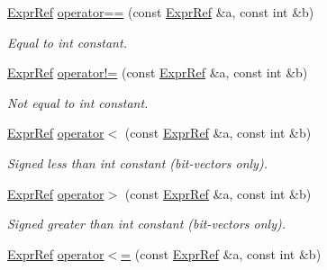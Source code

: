\begin{DoxyCompactItemize}
\mbox{\hyperlink{classilang_1_1_expr_ref}{Expr\+Ref}} \mbox{\hyperlink{namespaceilang_a0a5988961e07922c24fb867882884968}{operator==}} (const \mbox{\hyperlink{classilang_1_1_expr_ref}{Expr\+Ref}} \&a, const int \&b)
\begin{DoxyCompactList}\small\item\em Equal to int constant. \end{DoxyCompactList}\item 
\mbox{\label{namespaceilang_a13309390fcb98b680269a31df32ee983}} 
\mbox{\hyperlink{classilang_1_1_expr_ref}{Expr\+Ref}} \mbox{\hyperlink{namespaceilang_a13309390fcb98b680269a31df32ee983}{operator!=}} (const \mbox{\hyperlink{classilang_1_1_expr_ref}{Expr\+Ref}} \&a, const int \&b)
\begin{DoxyCompactList}\small\item\em Not equal to int constant. \end{DoxyCompactList}\item 
\mbox{\label{namespaceilang_accb89a7f987956d5bd1d9f7233c318d6}} 
\mbox{\hyperlink{classilang_1_1_expr_ref}{Expr\+Ref}} \mbox{\hyperlink{namespaceilang_accb89a7f987956d5bd1d9f7233c318d6}{operator$<$}} (const \mbox{\hyperlink{classilang_1_1_expr_ref}{Expr\+Ref}} \&a, const int \&b)
\begin{DoxyCompactList}\small\item\em Signed less than int constant (bit-\/vectors only). \end{DoxyCompactList}\item 
\mbox{\label{namespaceilang_ac1048b48f1599debc1925e8d171d6de9}} 
\mbox{\hyperlink{classilang_1_1_expr_ref}{Expr\+Ref}} \mbox{\hyperlink{namespaceilang_ac1048b48f1599debc1925e8d171d6de9}{operator$>$}} (const \mbox{\hyperlink{classilang_1_1_expr_ref}{Expr\+Ref}} \&a, const int \&b)
\begin{DoxyCompactList}\small\item\em Signed greater than int constant (bit-\/vectors only). \end{DoxyCompactList}\item 
\mbox{\label{namespaceilang_aaa815eeb1ccb2596476fe310a286ed1c}} 
\mbox{\hyperlink{classilang_1_1_expr_ref}{Expr\+Ref}} \mbox{\hyperlink{namespaceilang_aaa815eeb1ccb2596476fe310a286ed1c}{operator$<$=}} (const \mbox{\hyperlink{classilang_1_1_expr_ref}{Expr\+Ref}} \&a, const int \&b)

\end{DoxyCompactItemize}
